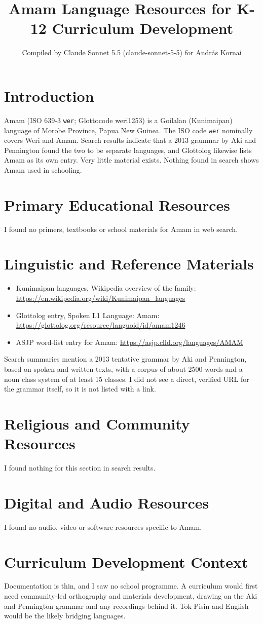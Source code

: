 \documentclass[12pt]{article}
\title{Amam Language Resources for K-12 Curriculum Development}
\author{Compiled by Claude Sonnet 5.5 (claude-sonnet-5-5) for Andr\'as Kornai}
\date{}
\begin{document}
\maketitle

\section{Introduction}
Amam (ISO 639-3 \texttt{wer}; Glottocode weri1253) is a Goilalan (Kunimaipan) language of Morobe Province, Papua New Guinea. The ISO code \texttt{wer} nominally covers Weri and Amam. Search results indicate that a 2013 grammar by Aki and Pennington found the two to be separate languages, and Glottolog likewise lists Amam as its own entry. Very little material exists. Nothing found in search shows Amam used in schooling.

\section{Primary Educational Resources}
I found no primers, textbooks or school materials for Amam in web search.

\section{Linguistic and Reference Materials}
\begin{itemize}
\item Kunimaipan languages, Wikipedia overview of the family: \url{https://en.wikipedia.org/wiki/Kunimaipan_languages}
\item Glottolog entry, Spoken L1 Language: Amam: \url{https://glottolog.org/resource/languoid/id/amam1246}
\item ASJP word-list entry for Amam: \url{https://asjp.clld.org/languages/AMAM}
\end{itemize}
Search summaries mention a 2013 tentative grammar by Aki and Pennington, based on spoken and written texts, with a corpus of about 2500 words and a noun class system of at least 15 classes. I did not see a direct, verified URL for the grammar itself, so it is not listed with a link.

\section{Religious and Community Resources}
I found nothing for this section in search results.

\section{Digital and Audio Resources}
I found no audio, video or software resources specific to Amam.

\section{Curriculum Development Context}
Documentation is thin, and I saw no school programme. A curriculum would first need community-led orthography and materials development, drawing on the Aki and Pennington grammar and any recordings behind it. Tok Pisin and English would be the likely bridging languages.
\end{document}
